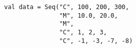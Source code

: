 \begin{lstlisting}[style=scalaioScala]
val data = Seq("C", 100, 200, 300,
               "M", 10.0, 20.0,
               "M",
               "C", 1, 2, 3,
               "C", -1, -3, -7, -8)
\end{lstlisting}
